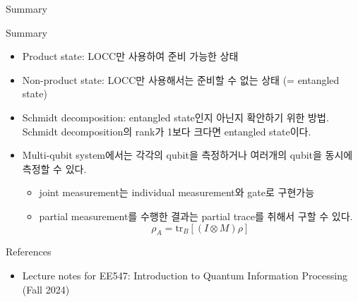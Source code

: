 \documentclass[9pt]{beamer}
\begin{document}
    \begin{frame}{Summary}
        \begin{block}{Summary}
            \begin{itemize}
                \item Product state: LOCC만 사용하여 준비 가능한 상태
                \item Non-product state: LOCC만 사용해서는 준비할 수 없는 상태 (= entangled state)
                \item Schmidt decomposition: entangled state인지 아닌지 확안하기 위한 방법. Schmidt decomposition의 rank가 1보다 크다면 entangled state이다.
                \item Multi-qubit system에서는 각각의 qubit을 측정하거나 여러개의 qubit을 동시에 측정할 수 있다.
                \begin{itemize}
                    \item joint measurement는 individual measurement와 gate로 구현가능
                    \item partial measurement를 수행한 결과는 partial trace를 취해서 구할 수 있다. 
                    \begin{equation*}
                        \rho_A= \text{tr}_B[(I\otimes M) \rho]
                    \end{equation*}
                \end{itemize}
            \end{itemize}
        \end{block}
    \end{frame}


    \begin{frame}{References}
    
        \begin{itemize}
            \item Lecture notes for EE547: Introduction to Quantum Information Processing (Fall 2024)
        \end{itemize}
        \vspace{6cm}
    \end{frame}
\end{document}
